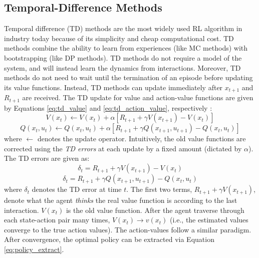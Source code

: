 \subsection{Temporal-Difference Methods}
Temporal difference (TD) methods are the most widely used RL algorithm in industry today because of its simplicity and cheap computational cost. TD methods combine the ability to learn from experiences (like MC methods) with bootstrapping (like DP methods). TD methods do not require a model of the system, and will instead learn the dynamics from interactions. Moreover, TD methods do not need to wait until the termination of an episode before updating its value functions. Instead, TD methods can update immediately after $x_{t+1}$ and $R_{t+1}$ are received. The TD update for value and action-value functions are given by Equations \ref{eq:td_value} and \ref{eq:td_action_value}, respectively \cite{ref-td}:
\begin{equation}
    V(x_t) \leftarrow V(x_t) + \alpha \left[R_{t+1} + \gamma V(x_{t+1}) - V(x_t) \right]
    \label{eq:td_value}
\end{equation}
\begin{equation}
    Q(x_t, u_t) \leftarrow Q(x_t, u_t) + \alpha \left[R_{t+1} + \gamma Q(x_{t+1}, u_{t+1}) - Q(x_t, u_t) \right]
    \label{eq:td_action_value}
\end{equation}
where $\leftarrow$ denotes the update operator. Intuitively, the old value functions are corrected using the \textit{TD errors} at each update by a fixed amount (dictated by $\alpha$).  The TD errors are given as:
$$\delta_t = R_{t+1} + \gamma V(x_{t+1}) - V(x_t)$$
$$\delta_t = R_{t+1} + \gamma Q(x_{t+1}, u_{t+1}) - Q(x_t, u_t)$$
where $\delta_t$ denotes the TD error at time $t$.  The first two terms, $R_{t+1} + \gamma V(x_{t+1})$, denote what the agent \textit{thinks} the real value function is according to the last interaction.  $V(x_t)$ is the old value function. After the agent traverse through each state-action pair many times,  $V(x_t) \rightarrow v(x_t)$ (i.e., the estimated values converge to the true action values). The action-values follow a similar paradigm. After convergence, the optimal policy can be extracted via Equation \ref{eq:policy_extract}.




